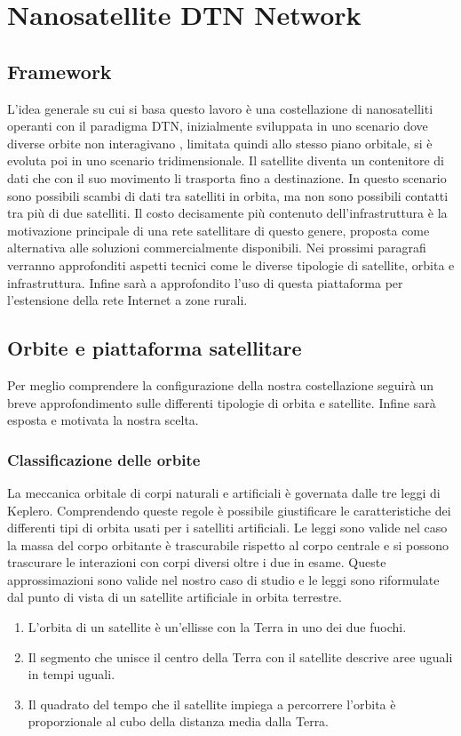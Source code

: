 \documentclass[a4paper]{article}
\begin{document}
		
	
	\section{Nanosatellite DTN Network}
		
		\subsection{Framework}	

		L'idea generale su cui si basa questo lavoro è una costellazione di nanosatelliti operanti con il paradigma DTN, inizialmente sviluppata in uno scenario dove diverse orbite non interagivano \cite{cello2014hot}, limitata quindi allo stesso piano orbitale, si è evoluta poi in uno scenario tridimensionale. Il satellite diventa un contenitore di dati che con il suo movimento li trasporta fino a destinazione. In questo scenario sono possibili scambi di dati tra satelliti in orbita, ma non sono possibili contatti tra più di due satelliti. Il costo decisamente più contenuto dell'infrastruttura è la motivazione principale di una rete satellitare di questo genere, proposta come alternativa alle soluzioni commercialmente disponibili. Nei prossimi paragrafi verranno approfonditi aspetti tecnici come le diverse tipologie di satellite, orbita e infrastruttura. Infine sarà a approfondito l'uso di questa piattaforma per l'estensione della rete Internet a zone rurali.
		
		\subsection{Orbite e piattaforma satellitare}
		Per meglio comprendere la configurazione della nostra costellazione seguirà un breve approfondimento sulle differenti tipologie di orbita e satellite. Infine sarà esposta e motivata la nostra scelta.

			\subsubsection{Classificazione delle orbite}
			La meccanica orbitale di corpi naturali e artificiali è governata dalle tre leggi di Keplero. Comprendendo queste regole è possibile giustificare le caratteristiche dei differenti tipi di orbita usati per i satelliti artificiali. Le leggi sono valide nel caso la massa del corpo orbitante è trascurabile rispetto al corpo centrale e si possono trascurare le interazioni con corpi diversi oltre i due in esame. Queste approssimazioni sono valide nel nostro caso di studio e le leggi sono riformulate dal punto di vista di un satellite artificiale in orbita terrestre.
			\begin{enumerate}
				\item L'orbita di un satellite è un'ellisse con la Terra in uno dei due fuochi.
				\item Il segmento che unisce il centro della Terra con il satellite descrive aree uguali in tempi uguali.
				\item Il quadrato del tempo che il satellite impiega a percorrere l'orbita è proporzionale al cubo della distanza media dalla Terra.
			\end{enumerate}
			
\end{document}

